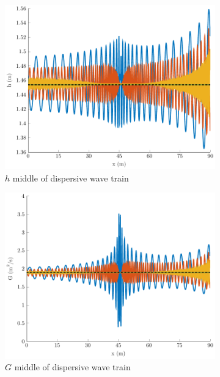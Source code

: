 \documentclass[10pt]{elsarticle}
\begin{document}
\begin{figure}
	\centering
	\begin{subfigure}{0.32\textwidth}
		\centering
		\includegraphics[width=\textwidth]{./Figures/Simulations/Study/Serre2SWWECloser/hMid.pdf}
		\caption{$h$ middle of dispersive wave train}
	\end{subfigure}
	\begin{subfigure}{0.32\textwidth}
		\centering
		\includegraphics[width=\textwidth]{./Figures/Simulations/Study/Serre2SWWECloser/GMid.pdf}
		\caption{$G$ middle of dispersive wave train}
	\end{subfigure}
	\begin{subfigure}{0.32\textwidth}

\end{subfigure}
\end{figure}
\end{document}
